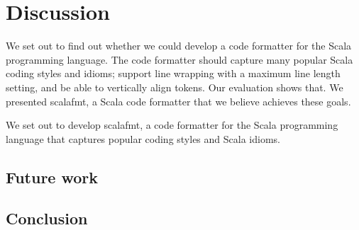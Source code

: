 \section{Discussion}
We set out to find out whether we could develop a code formatter for the Scala programming language.
The code formatter should capture many popular Scala coding styles and idioms;
support line wrapping with a maximum line length setting, and be able to vertically align tokens.
Our evaluation shows that.
We presented scalafmt, a Scala code formatter that we believe achieves these goals.

We set out to develop scalafmt, a code formatter for the Scala programming language that captures popular coding styles and Scala idioms.

\subsection{Future work}
\subsection{Conclusion}
